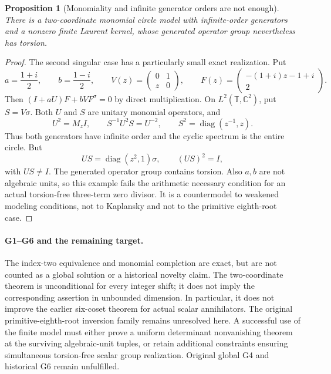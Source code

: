 \documentclass[11pt,a4paper,oneside]{report}
\newtheorem{proposition}[theorem]{Proposition}
\theoremstyle{definition}
\theoremstyle{remark}
\newcommand{\C}{\mathbb C}
\newcommand{\T}{\mathbb T}
\begin{document}
\begin{proposition}[Monomiality and infinite generator orders are not enough]
\label{M13:nextinv:countermodel}
There is a two-coordinate monomial circle model with infinite-order
generators and a nonzero finite Laurent kernel, whose generated
operator group nevertheless has torsion.
\end{proposition}
\begin{proof}
The second singular case has a particularly small exact realization.
Put
\[
 a=\frac{1+i}{2},\qquad b=\frac{1-i}{2},\qquad
 V(z)=\begin{pmatrix}0&1\\z&0\end{pmatrix},\qquad
 F(z)=\begin{pmatrix}-(1+i)z-1+i\\2\end{pmatrix}.
\]
Then $(I+aU)F+bVF^\sigma=0$ by direct multiplication.
On $L^2(\T,\C^2)$, put $S=V\sigma$. Both $U$ and $S$ are
unitary monomial operators, and
\[
 U^2=M_zI,\qquad S^{-1}U^2S=U^{-2},\qquad
 S^2=\operatorname{diag}(z^{-1},z).
\]
Thus both generators have infinite order and the cyclic spectrum
is the entire circle. But
\[
 US=\operatorname{diag}(z^2,1)\sigma,
 \qquad (US)^2=I,
\]
with $US\ne I$. The generated operator group contains torsion.
Also $a,b$ are not algebraic units, so this example fails the
arithmetic necessary condition for an actual torsion-free
three-term zero divisor. It is a countermodel to weakened modeling
conditions, not to Kaplansky and not to the primitive eighth-root case.
\end{proof}

\paragraph{G1--G6 and the remaining target.}
The index-two equivalence and monomial completion are exact, but
are not counted as a global solution or a historical novelty claim.
The two-coordinate theorem is unconditional for every integer shift;
it does not imply the corresponding assertion in unbounded dimension.
In particular, it does not improve the earlier six-coset theorem for
actual scalar annihilators. The original primitive-eighth-root
inversion family remains unresolved here. A successful use of the
finite model must either prove a uniform determinant nonvanishing
theorem at the surviving algebraic-unit tuples, or retain additional
constraints ensuring simultaneous torsion-free scalar group realization.
Original global G4 and historical G6 remain unfulfilled.
\end{document}
